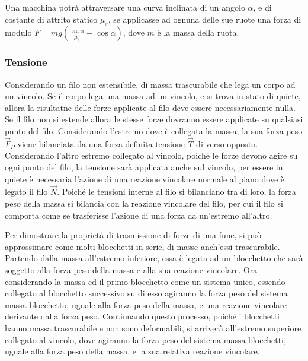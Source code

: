 \documentclass{article}
\numberwithin{equation}{subsection}
\begin{document}
Una macchina potrà attraversare una curva inclinata di un angolo $\alpha$, e di costante di attrito statico $\mu_s$, se applicasse ad ognuna delle sue ruote una 
forza di modulo $F=mg\left(\displaystyle\frac{\sin\alpha}{\mu_s}-\cos\alpha\right)$, dove $m$ è la massa della ruota.

\subsubsection{Tensione}
Considerando un filo non estensibile, di massa trascurabile che 
lega un corpo ad un vincolo. Se il corpo lega una massa ad un vincolo, e si trova in stato di quiete, allora la risultatne delle forze applicate al filo deve essere 
necessariamente nulla. Se il filo non si estende allora le stesse forze dovranno essere applicate su qualsiasi punto del filo. Considerando l'estremo dove è collegata 
la massa, la sua forza peso $\vec{F}_P$ viene bilanciata da una forza definita tensione $\vec{T}$ di verso opposto. Considerando l'altro estremo collegato al vincolo, poiché 
le forze devono agire su ogni punto del filo, la tensione sarà applicata anche sul vincolo, per essere in quiete è necessaria l'azione di una reazione vincolare normale al piano 
dove è legato il filo $\vec{N}$. Poiché le tensioni interne al filo si bilanciano tra di loro, la forza peso della massa si bilancia con la reazione vincolare del filo, per cui 
il filo si comporta come se trasferisse l'azione di una forza da un'estremo all'altro. 

\begin{center}\end{center}

Per dimostrare la proprietà di trasmissione di forze di una fune, si può approssimare 
come molti blocchetti in serie, di masse anch'essi trascurabile. 
Partendo dalla massa all'estremo inferiore, essa è legata ad un 
blocchetto che sarà soggetto alla forza peso della massa e alla 
sua reazione vincolare. Ora considerando la massa ed il primo 
blocchetto come un sistema unico, essendo collegato al blocchetto 
successivo su di esso agiranno la forza peso del sistema massa-blocchetto, uguale alla forza peso della massa, e una reazione 
vincolare derivante dalla forza peso. Continuando questo processo, 
poiché i blocchetti hanno massa trascurabile e non sono deformabili, 
si arriverà all'estremo superiore collegato al vincolo, dove agiranno 
la forza peso del sistema massa-blocchetti, uguale alla forza peso 
della massa, e la sua relativa reazione vincolare.
\end{document}
